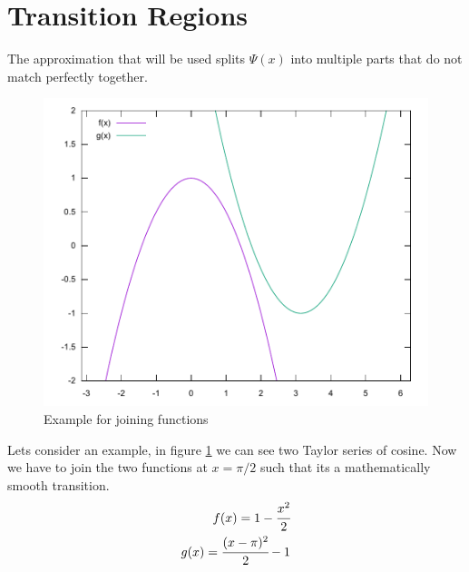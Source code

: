\documentclass[11pt,DIV=10,final]{scrreprt} %
\begin{document}
\section{Transition Regions}
The approximation that will be used splits $\Psi(x)$ into multiple parts that do not match perfectly together.

\begin{figure}[h]\label{fig:cos_taylor}
  \centering
  \includegraphics[width=.9\textwidth]{plots/cos_taylor.pdf}
  \caption{Example for joining functions}
\end{figure}

Lets consider an example, in figure \ref{fig:cos_taylor} we can see two Taylor series of cosine. Now we have to join the two functions at $x = \pi / 2$ such that its a mathematically smooth transition.
\begin{align}
  \label{joint:f}
  f(x) = 1 - \cfrac{x^{2}}{2} \\
  \label{joint:g}
  g(x) = \cfrac{(x - \pi)^{2}}{2} -  1
\end{align}
\end{document}
